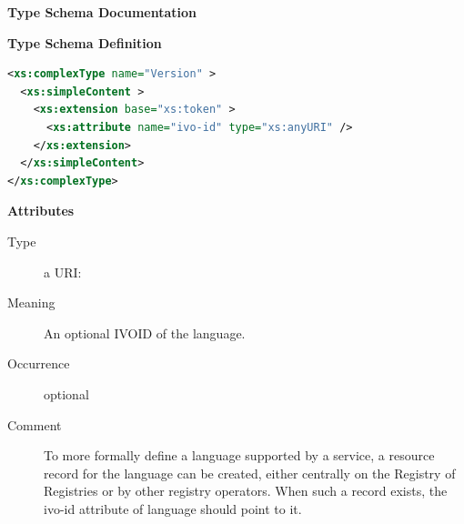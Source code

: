 \documentclass{ivoa}
\begin{document}
\begin{generated}
\begingroup
        \renewcommand*\descriptionlabel[1]{%
        \hbox to 5.5em{\emph{#1}\hfil}}\vspace{2ex}\noindent\textbf{ Type Schema Documentation}



\vspace{1ex}\noindent\textbf{ Type Schema Definition}

\begin{lstlisting}[language=XML,basicstyle=\footnotesize]
<xs:complexType name="Version" >
  <xs:simpleContent >
    <xs:extension base="xs:token" >
      <xs:attribute name="ivo-id" type="xs:anyURI" />
    </xs:extension>
  </xs:simpleContent>
</xs:complexType>
\end{lstlisting}

\vspace{0.5ex}\noindent\textbf{ Attributes}

\begingroup\small\begin{bigdescription}
\item[ivo-id]
\begin{description}
\item[Type] a URI: 
\item[Meaning] An optional IVOID of the language.
\item[Occurrence] optional
\item[Comment] To more formally define a language supported by a service,
              a resource record for the language can be created, either
              centrally on the Registry of Registries or by other registry operators.
              When such a record exists, the ivo-id attribute of language
              should point to it.
\end{description}


\end{bigdescription}\endgroup

\endgroup
\end{generated}
\end{document}
